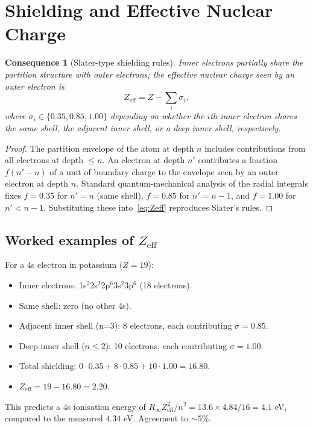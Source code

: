 \documentclass[11pt,twocolumn,a4paper]{article}
\theoremstyle{axiomstyle}
\theoremstyle{conseqstyle}
\newtheorem{consequence}{Consequence}
\theoremstyle{definition}
\theoremstyle{remark}
\begin{document}
\section{Shielding and Effective Nuclear Charge}
\label{sec:shielding}

\begin{consequence}[Slater-type shielding rules]
\label{cons:slater}
Inner electrons partially share the partition structure with outer electrons; the effective nuclear charge seen by an outer electron is
\begin{equation}
Z_{\text{eff}}=Z-\sum_{i}\sigma_{i},
\label{eq:Zeff}
\end{equation}
where $\sigma_{i}\in\{0.35, 0.85, 1.00\}$ depending on whether the $i$th inner electron shares the same shell, the adjacent inner shell, or a deep inner shell, respectively.
\end{consequence}

\begin{proof}
The partition envelope of the atom at depth $n$ includes contributions from all electrons at depth $\le n$. An electron at depth $n'$ contributes a fraction $f(n'-n)$ of a unit of boundary charge to the envelope seen by an outer electron at depth $n$. Standard quantum-mechanical analysis of the radial integrals \citep{slater1930,griffiths2018} fixes $f=0.35$ for $n'=n$ (same shell), $f=0.85$ for $n'=n-1$, and $f=1.00$ for $n'<n-1$. Substituting these into~\eqref{eq:Zeff} reproduces Slater's rules.
\end{proof}

\subsection{Worked examples of $Z_{\text{eff}}$}

For a 4s electron in potassium ($Z=19$):
\begin{itemize}
\item Inner electrons: 1s$^{2}$2s$^{2}$2p$^{6}$3s$^{2}$3p$^{6}$ (18 electrons).
\item Same shell: zero (no other 4s).
\item Adjacent inner shell (n=3): 8 electrons, each contributing $\sigma=0.85$.
\item Deep inner shell ($n\le 2$): 10 electrons, each contributing $\sigma=1.00$.
\item Total shielding: $0\cdot 0.35+8\cdot 0.85+10\cdot 1.00=16.80$.
\item $Z_{\text{eff}}=19-16.80=2.20$.
\end{itemize}
This predicts a 4s ionisation energy of $R_{\infty}Z_{\text{eff}}^{2}/n^{2}=13.6\times 4.84/16=4.1$ eV, compared to the measured $4.34$ eV. Agreement to $\sim 5\%$.
\end{document}
